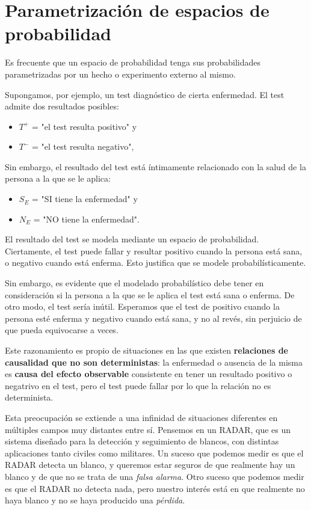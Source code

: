 \documentclass[11pt]{article}
\begin{document}
    \section*{Parametrización de espacios de
probabilidad}\label{parametrizaciuxf3n-de-espacios-de-probabilidad}

Es frecuente que un espacio de probabilidad tenga sus probabilidades
parametrizadas por un hecho o experimento externo al mismo.

Supongamos, por ejemplo, un test diagnóstico de cierta enfermedad. El
test admite dos resultados posibles: 
\begin{itemize}
\item \(T^+\) = "el test resulta
positivo" y 
\item \(T^-\) = "el test resulta negativo",
\end{itemize}

Sin embargo, el resultado del test está íntimamente relacionado con la
salud de la persona a la que se le aplica: 
\begin{itemize}
\item \(S_E\) = "SI tiene la
enfermedad" y 
\item \(N_E\) = "NO tiene la enfermedad".
\end{itemize}

    El resultado del test se modela mediante un espacio de probabilidad.
Ciertamente, el test puede fallar y resultar positivo cuando la persona
está sana, o negativo cuando está enferma. Esto justifica que se modele
probabilísticamente.

Sin embargo, es evidente que el modelado probabilístico debe tener en
consideración si la persona a la que se le aplica el test está sana o
enferma. De otro modo, el test sería inútil. Esperamos que el test de
positivo cuando la persona esté enferma y negativo cuando está sana, y
no al revés, sin perjuicio de que pueda equivocarse a veces.

Este razonamiento es propio de situaciones en las que existen
\textbf{relaciones de causalidad que no son deterministas}: la
enfermedad o ausencia de la misma es \textbf{causa del efecto
observable} consistente en tener un resultado positivo o negatrivo en el
test, pero el test puede fallar por lo que la relación no es
determinista.

    Esta preocupación se extiende a una infinidad de situaciones diferentes
en múltiples campos muy distantes entre sí. Pensemos en un RADAR, que es
un sistema diseñado para la detección y seguimiento de blancos, con
distintas aplicaciones tanto civiles como militares. Un suceso que
podemos medir es que el RADAR detecta un blanco, y queremos estar
seguros de que realmente hay un blanco y de que no se trata de una
\emph{falsa alarma}. Otro suceso que podemos medir es que el RADAR no
detecta nada, pero nuestro interés está en que realmente no haya blanco
y no se haya producido una \emph{pérdida}.
\end{document}

